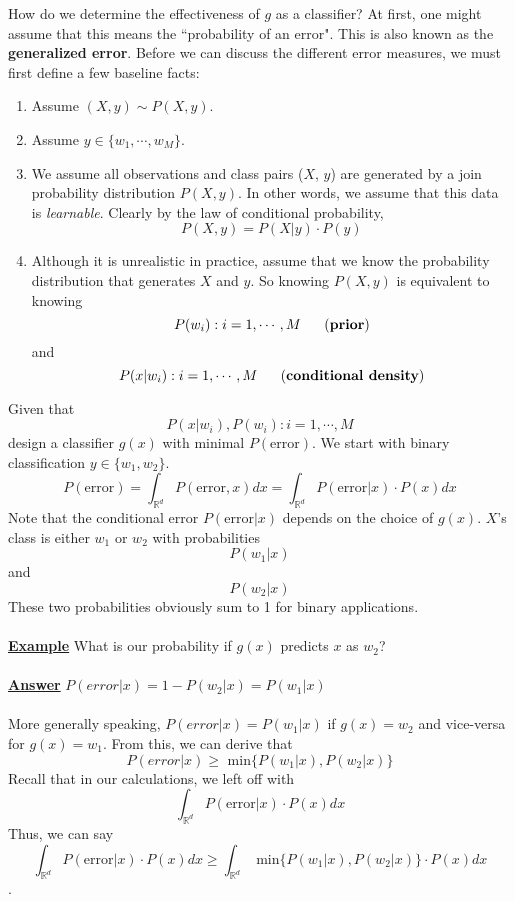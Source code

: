 \documentclass[12pt]{article}
\newcommand{\aside}[1]{\noindent\textbf{\underline{#1}}}
\begin{document}
How do we determine the effectiveness of $g$ as a classifier? At first, one might assume that this means the ``probability of an error". This is also known as the \textbf{generalized error}. Before we can discuss the different error measures, we must first define a few baseline facts:

\begin{enumerate}
\item Assume $(X, y) \sim P(X, y)$. 
\item Assume $y \in \{w_1, \cdots, w_M\}$.
\item We assume all observations and class pairs ($X$, $y$) are generated by a join probability distribution $P(X, y)$. In other words, we assume that this data is \textit{learnable}. Clearly by the law of conditional probability, \[P(X, y) = P(X | y) \cdot P(y)\]
\item Although it is unrealistic in practice, assume that we know the probability distribution that generates $X$ and $y$. So knowing $P(X, y)$ is equivalent to knowing \[P(w_i) : i=1, \cdots, M\text{~~~~~(\textbf{prior})}\] and \[P(x | w_i) : i=1, \cdots, M\text{~~~~~(\textbf{conditional density})}\]
\end{enumerate}

Given that \[P(x|w_i), P(w_i) : i=1, \cdots, M\] design a classifier $g(x)$ with minimal $P(\text{error})$. We start with binary classification $y \in \{w_1, w_2\}$. \[P(\text{error}) = \int_{\mathbb{R}^d} P(\text{error}, x)dx = \int_{\mathbb{R}^d} P(\text{error} | x) \cdot P(x) dx\]Note that the conditional error $P(\text{error} | x)$ depends on the choice of $g(x)$. $X$'s class is either $w_1$ or $w_2$ with probabilities \[P(w_1 | x)\] and \[P(w_2 | x)\]These two probabilities obviously sum to 1 for binary applications.
\\ \\
\aside{Example} What is our probability if $g(x)$ predicts $x$ as $w_2$?
\\ \\
\aside{Answer} $P(error | x) = 1 - P(w_2 | x) = P(w_1 | x)$
\\ \\
More generally speaking, $P(error | x) = P(w_1 | x)$ if $g(x) = w_2$ and vice-versa for $g(x) = w_1$. From this, we can derive that \[P(error | x) \geq\text{ min}\{P(w_1 | x), P(w_2 | x)\}\]Recall that in our calculations, we left off with \[\int_{\mathbb{R}^d} P(\text{error} | x) \cdot P(x) dx\]Thus, we can say \[\int_{\mathbb{R}^d} P(\text{error} | x) \cdot P(x) dx \geq \int_{\mathbb{R}^d}\text{ min}\{P(w_1 | x), P(w_2 | x)\} \cdot P(x) dx\]. \\ \\
\end{document}
